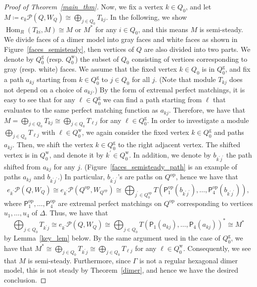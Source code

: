 \documentclass[ALCO,ThmDefs,Unicode]{cedram}
\newcommand{\rmg}{\mathrm{g}}
\newcommand{\rmw}{\mathrm{w}}
\newcommand{\calP}{\mathcal{P}}
\newcommand{\sfP}{\mathsf{P}}
\DeclareMathOperator{\op}{op}
\DeclareMathOperator{\Hom}{Hom}
\begin{document}
\begin{proof}[Proof of Theorem~\ref{main_thm}]
Now, we fix a vertex $k\in Q_0$, and let $M\coloneqq e_k\calP(Q, W_Q)\cong\bigoplus_{j\in Q_0}T_{kj}$. In the following, we show $\Hom_R(T_{ki},M)\cong M$ or $M^*$ for any $i\in Q_0$, and this means $M$ is semi-steady. We divide faces of a dimer model into gray faces and white faces as shown in Figure~\ref{faces_semisteady}, then vertices of $Q$ are also divided into two parts. We denote by $Q_0^{\rmg}$ (resp. $Q_0^{\rmw}$) the subset of $Q_0$ consisting of vertices corresponding to gray (resp. white) faces. We assume that the fixed vertex $k\in Q_0$ is in $Q_0^{\rmg}$, and fix a path $a_{kj}$ starting from $k\in Q_0^{\rmg}$ to $j\in Q_0$ for all $j$. (Note that module $T_{kj}$ does not depend on a choice of $a_{kj}$.) By the form of extremal perfect matchings, it is easy to see that for any $\ell\in Q_0^{\rmg}$ we can find a path starting from $\ell$ that evaluates to the same perfect matching function as $a_{kj}$. Therefore, we have that $M=\bigoplus_{j\in Q_0}T_{kj}\cong\bigoplus_{j\in Q_0}T_{\ell j}$ for any $\ell\in Q_0^{\rmg}$. In order to investigate a module $\bigoplus_{j\in Q_0}T_{\ell j}$ with $\ell\in Q_0^{\rmw}$, we again consider the fixed vertex $k\in Q_0^{\rmg}$ and paths $a_{kj}$. Then, we shift the vertex $k\in Q_0^{\rmg}$ to the right adjacent vertex. The shifted vertex is in $Q_0^{\rmw}$, and denote it by $k^\prime\in Q_0^{\rmw}$. In addition, we denote by $b_{k^\prime j^\prime}$ the path shifted from $a_{kj}$ for any $j$. (Figure~\ref{faces_semisteady_path} is an example of paths $a_{kj}$ and $b_{k^\prime j^\prime}$.) In particular, $b_{k^\prime j^\prime}$'s are paths on $Q^{\op}$, hence we have that
\[
e_{k^\prime}\calP(Q,W_Q)\cong e_{k^\prime}\calP(Q^{\op},W_{Q^{\op}})
\cong\bigoplus_{j^\prime\in Q_0^{\op}} T(\sfP^{\op}_1(b_{k^\prime j^\prime}),\dots,\sfP^{\op}_4(b_{k^\prime j^\prime})),
\]
where $\sfP^{\op}_1,\dots,\sfP^{\op}_4$ are extremal perfect matchings on $Q^{\op}$ corresponding to vertices $u_1,\dots,u_4$ of $\Delta$. Thus, we have that
\[
\bigoplus_{j\in Q_0}T_{k^\prime j}\cong e_{k^\prime}\calP(Q,W_Q)\cong\bigoplus_{j\in Q_0}T(\sfP_1(a_{kj}),\dots,\sfP_4(a_{kj}))^*\cong M^*
\]
by Lemma~\ref{key_lem} below. By the same argument used in the case of $Q_0^{\rmg}$, we have that $M^*\cong\bigoplus_{j\in Q_0}T_{k^\prime j}\cong\bigoplus_{j\in Q_0}T_{\ell j}$ for any $\ell\in Q_0^{\rmw}$. Consequently, we see that $M$ is semi-steady. Furthermore, since $\Gamma$ is not a regular hexagonal dimer model, this is not steady by Theorem~\ref{dimer}, and hence we have the desired conclusion.



\end{proof}
\end{document}
